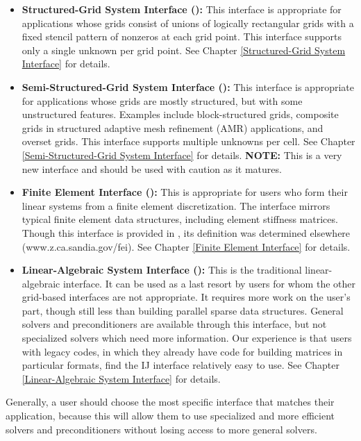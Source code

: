 \begin{itemize}

\item
{\bf Structured-Grid System Interface ():} This interface
is appropriate for applications whose grids consist of unions of
logically rectangular grids with a fixed stencil pattern of nonzeros
at each grid point.  This interface supports only a single unknown per
grid point.
See Chapter \ref{Structured-Grid System Interface} for details.

\item
{\bf Semi-Structured-Grid System Interface ():} This
interface is appropriate for applications whose grids are mostly
structured, but with some unstructured features.  Examples include
block-structured grids, composite grids in structured adaptive mesh
refinement (AMR) applications, and overset grids.  This interface
supports multiple unknowns per cell.
See Chapter \ref{Semi-Structured-Grid System Interface} for details.
{\bf NOTE:} This is a very new interface and should be used with
caution as it matures.

\item
{\bf Finite Element Interface ():} This is appropriate for
users who form their linear systems from a finite element
discretization.  The interface mirrors typical finite element data
structures, including element stiffness matrices.  Though this
interface is provided in \hypre{}, its definition was determined
elsewhere (www.z.ca.sandia.gov/fei).
See Chapter \ref{Finite Element Interface} for details.

\item
{\bf Linear-Algebraic System Interface ():} This is the
traditional linear-algebraic interface.  It can be used as a last
resort by users for whom the other grid-based interfaces are not
appropriate.  It requires more work on the user's part, though still
less than building parallel sparse data structures.  General solvers
and preconditioners are available through this interface, but not
specialized solvers which need more information.  Our experience is
that users with legacy codes, in which they already have code for
building matrices in particular formats, find the IJ interface
relatively easy to use.
See Chapter \ref{Linear-Algebraic System Interface} for details.

\end{itemize}

Generally, a user should choose the most specific interface that
matches their application, because this will allow them to use
specialized and more efficient solvers and preconditioners without
losing access to more general solvers.


